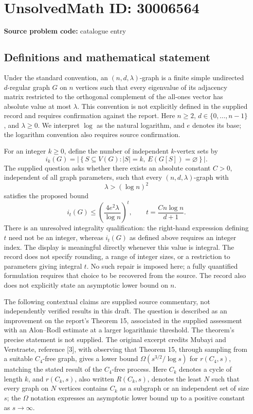 \documentclass[11pt]{article}
\begin{document}
\section*{UnsolvedMath ID: 30006564}
\textbf{Source problem code:} catalogue entry
\subsection{Definitions and mathematical statement}
Under the standard convention, an \((n,d,\lambda)\)-graph is a finite simple undirected \(d\)-regular graph \(G\) on \(n\) vertices such that every eigenvalue of its adjacency matrix restricted to the orthogonal complement of the all-ones vector has absolute value at most \(\lambda\). This convention is not explicitly defined in the supplied record and requires confirmation against the report. Here \(n\geq 2\), \(d\in\{0,\ldots,n-1\}\), and \(\lambda\geq0\). We interpret \(\log\) as the natural logarithm, and \(e\) denotes its base; the logarithm convention also requires source confirmation.

For an integer \(k\geq0\), define the number of independent \(k\)-vertex sets by
\[
 i_k(G)=\left|\left\{S\subseteq V(G): |S|=k,\ E(G[S])=\varnothing\right\}\right|.
\]
The supplied question asks whether there exists an absolute constant \(C>0\), independent of all graph parameters, such that every \((n,d,\lambda)\)-graph with
\[
 \lambda>(\log n)^2
\]
satisfies the proposed bound
\[
 i_t(G)\leq\left(\frac{4e^2\lambda}{\log n}\right)^t,
 \qquad t=\frac{Cn\log n}{d+1}.
\]
There is an unresolved integrality qualification: the right-hand expression defining \(t\) need not be an integer, whereas \(i_t(G)\) as defined above requires an integer index. The display is meaningful directly whenever this value is integral. The record does not specify rounding, a range of integer sizes, or a restriction to parameters giving integral \(t\). No such repair is imposed here; a fully quantified formulation requires that choice to be recovered from the source. The record also does not explicitly state an asymptotic lower bound on \(n\).

The following contextual claims are supplied source commentary, not independently verified results in this draft. The question is described as an improvement on the report's Theorem 15, associated in the supplied assessment with an Alon--Rodl estimate at a larger logarithmic threshold. The theorem's precise statement is not supplied. The original excerpt credits Mubayi and Verstraete, reference [3], with observing that Theorem 15, through sampling from a suitable \(C_4\)-free graph, gives a lower bound \(\Omega(s^{3/2}/\log s)\) for \(r(C_4,s)\), matching the stated result of the \(C_4\)-free process. Here \(C_k\) denotes a cycle of length \(k\), and \(r(C_k,s)\), also written \(R(C_k,s)\), denotes the least \(N\) such that every graph on \(N\) vertices contains \(C_k\) as a subgraph or an independent set of size \(s\); the \(\Omega\) notation expresses an asymptotic lower bound up to a positive constant as \(s\to\infty\).
\end{document}
